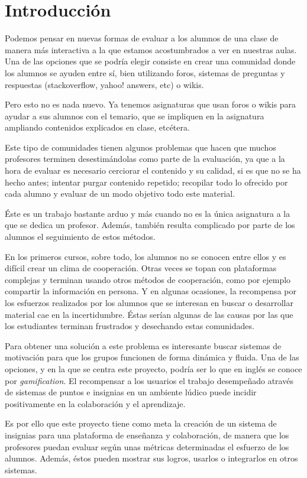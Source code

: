 \section{Introducción}
	Podemos pensar en nuevas formas de evaluar a los alumnos de una clase de manera más interactiva a la que estamos acostumbrados a ver en nuestras aulas. Una de las opciones que se podría elegir consiste en crear una comunidad donde los alumnos se ayuden entre sí, bien utilizando foros, sistemas de preguntas y respuestas (stackoverflow, yahoo! answers, etc) o wikis.

	Pero esto no es nada nuevo. Ya tenemos asignaturas que usan foros o wikis para ayudar a sus alumnos con el temario, que se impliquen en la asignatura ampliando contenidos explicados en clase, etcétera.

	Este tipo de comunidades tienen algunos problemas que hacen que muchos profesores terminen desestimándolas como parte de la evaluación, ya que a la hora de evaluar es necesario cerciorar el contenido y su calidad, si es que no se ha hecho antes; intentar purgar contenido repetido; recopilar todo lo ofrecido por cada alumno y evaluar de un modo objetivo todo este material.

	Éste es un trabajo bastante arduo y más cuando no es la única asignatura a la que se dedica un profesor. Además, también resulta complicado por parte de los alumnos el seguimiento de estos métodos.

	En los primeros cursos, sobre todo, los alumnos no se conocen entre ellos y es difícil crear un clima de cooperación. Otras veces se topan con plataformas complejas y terminan usando otros métodos de cooperación, como por ejemplo compartir la información en persona. Y en algunas ocasiones, la recompensa por los esfuerzos realizados por los alumnos que se interesan en buscar o desarrollar material cae en la incertidumbre. Éstas serían algunas de las causas por las que los estudiantes terminan frustrados y desechando estas comunidades.

	Para obtener una solución a este problema es interesante buscar sistemas de motivación para que los grupos funcionen de forma dinámica y fluida. Una de las opciones, y en la que se centra este proyecto, podría ser lo que en inglés se conoce por \emph{gamification}. El recompensar a los usuarios el trabajo desempeñado através de sistemas de puntos e insignias en un ambiente lúdico puede incidir positivamente en la colaboración y el aprendizaje.

	Es por ello que este proyecto tiene como meta la creación de un sistema de insignias para una plataforma de enseñanza y colaboración, de manera que los profesores puedan evaluar según unas métricas determinadas el esfuerzo de los alumnos. Además, éstos pueden mostrar sus logros, usarlos o integrarlos en otros sistemas.

